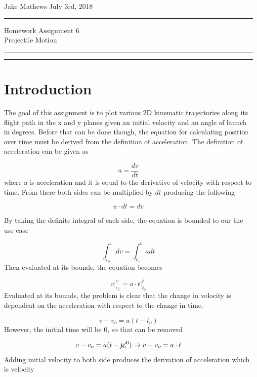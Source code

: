 \documentclass{article}
\begin{document}
Jake Mathews \hfill July 3rd, 2018 \\
\hrule
\begin{center}
\large {Homework Assignment 6}\\ \large{Projectile Motion}
\end{center}
\hrule
\vspace{1pt}
\hrule height 1pt

\section{Introduction}
The goal of this assignment is to plot various 2D kinematic trajectories along its flight path in the x and y planes given an initial velocity and an angle of launch in degrees. Before that can be done though, the equation for calculating position over time must be derived from the definition of acceleration. The definition of acceleration can be given as

\begin{equation}
\label{eq:1}
a = \frac{dv}{dt}
\end{equation}
where a is acceleration and it is equal to the derivative of velocity with respect to time. From there both sides can be multiplied by $dt$ producing the following

\begin{equation}
\label{eq:2}
a \cdot dt = dv
\end{equation}

By taking the definite integral of each side, the equation is bounded to our the use case

\begin{equation}
\label{eq:3}
\int_{v_o} ^ {v} dv = \int_{t_o} ^ {t} a dt
\end{equation}
Then evaluated at its bounds, the equation becomes

\begin{equation}
\label{eq:4}
v \Big|_{v_o}^{v} = a \cdot t \Big|_{t_o}^{t}
\end{equation}
Evaluated at its bounds, the problem is clear that the change in velocity is dependent on the acceleration with respect to the change in time.

\begin{equation}
\label{eq:5}
v - v_o = a (t - t_o)
\end{equation}
However, the initial time will be 0, so that can be removed

\begin{equation}
\label{eq:6}
v - v_o = a (t - \cancel{t_o}^{0}) \rightarrow v - v_o = a \cdot t
\end{equation}
Adding initial velocity to both side produces the derivation of acceleration which is velocity
\end{document}

